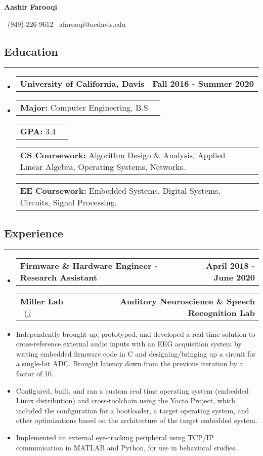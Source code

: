 \documentclass[10pt,letterpaper]{article}
\makeatletter
\newcommand{\items}[2]
{
	\begin{tabular*}{\linewidth}{l @{\extracolsep{\fill}} r}
		#1 & #2 \\
	\end{tabular*}
}
\newcommand{\header}[2]
{
	\begin{tabular*}{\linewidth}{l @{\extracolsep{\fill}} r}
		\hspace{-27pt} #1 & #2 \\
	\end{tabular*}
}
\newcommand{\sectionbreak}
{
	\vspace{-1.2em}
	\rule{\textwidth}{1.7pt}
	\vspace{-1.7em}
}
\makeatother
\begin{document}
\begin{center}
	{\LARGE \textbf{Aashir Farooqi}}

	\vspace{0.5em}
	\ (949)-226-9612 \textbar 
	\ afarooqi@ucdavis.edu\textbar
	\ \href{https://github.com/AashPointO}{\emph{\underline{}}}
	\\
\end{center}
\vspace{-20pt}


\subsection*{Education}
\sectionbreak

\begin{itemize}

	\item[] 
		\header
		{\textbf{University of California, Davis}}
		{\textbf{Fall 2016 - Summer 2020}}
	\item[]
		\vspace{-2.5pt}
	\items
		{\textbf{Major:} Computer Engineering, B.S}
		{}
	\items
		{\textbf{GPA:} 3.4}
		{}
	\items
		{\textbf{CS Coursework:} Algorithm Design \& Analysis, Applied Linear Algebra, Operating Systems, Networks.}
		{}
	\items
		{\textbf{EE Coursework:} Embedded Systems, Digital Systems, Circuits, Signal Processing.}
		{}
		{\vspace{-0.6em}}

\end{itemize}

\vspace{-24.65pt}

\subsection*{Experience}
\sectionbreak

\begin{itemize}
	\item[]
		\header
		{\textbf{Firmware \& Hardware Engineer - Research Assistant}} 
		{\textbf{April 2018 - June 2020}}
		\header
		{\textbf{Miller Lab} \ (\href{https://millerlab.faculty.ucdavis.edu}{\small \emph{\underline{\smash{millerlab.faculty.ucdavis.edu})}}} }
		{\textbf{Auditory Neuroscience \& Speech Recognition Lab}} 
	\item
		Independently brought up, prototyped, and developed a real time solution to cross-reference external audio inputs with an EEG acquisition system by writing embedded firmware code in C and designing/bringing up a circuit for a single-bit ADC. Brought latency down from the previous iteration by a factor of 10. 
	\item 
		Configured, built, and ran a custom real time operating system (embedded Linux distribution) and cross-toolchain using the Yocto Project, which included the configuration for a bootloader, a target operating system, and other optimizations based on the architecture of the target embedded system.
	\item 
		Implemented an external eye-tracking peripheral using TCP/IP communication in MATLAB and Python, for use in behavioral studies.
\end{itemize}
\end{document}
